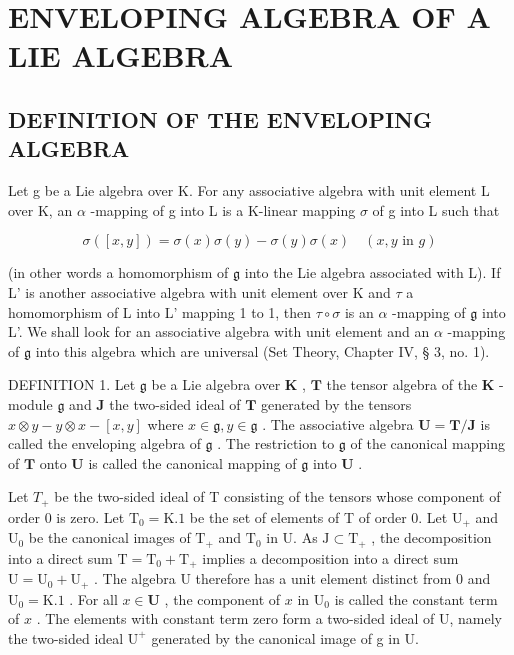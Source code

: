 \section{ENVELOPING ALGEBRA OF A LIE ALGEBRA}

\subsection{DEFINITION OF THE ENVELOPING ALGEBRA}

Let g be a Lie algebra over K. For any associative algebra with unit element L over K, an \(\alpha\) -mapping of g into L is a K-linear mapping \(\sigma\) of g into L such that

\[
\sigma ([ x, y ]) = \sigma (x) \sigma (y) - \sigma (y) \sigma (x) \quad (x, y \text {   in   } g)
\]

(in other words a homomorphism of \(\mathfrak{g}\) into the Lie algebra associated with L). If L' is another associative algebra with unit element over K and \(\tau\) a homomorphism of L into L' mapping 1 to 1, then \(\tau \circ \sigma\) is an \(\alpha\) -mapping of \(\mathfrak{g}\) into L'. We shall look for an associative algebra with unit element and an \(\alpha\) -mapping of \(\mathfrak{g}\) into this algebra which are universal (Set Theory, Chapter IV, § 3, no. 1).

DEFINITION 1. Let \(\mathfrak{g}\) be a Lie algebra over \(\mathbf{K}\) , \(\mathbf{T}\) the tensor algebra of the \(\mathbf{K}\) -module \(\mathfrak{g}\) and \(\mathbf{J}\) the two-sided ideal of \(\mathbf{T}\) generated by the tensors \(x \otimes y - y \otimes x - [x, y]\) where \(x \in \mathfrak{g}, y \in \mathfrak{g}\) . The associative algebra \(\mathbf{U} = \mathbf{T} / \mathbf{J}\) is called the enveloping algebra of \(\mathfrak{g}\) . The restriction to \(\mathfrak{g}\) of the canonical mapping of \(\mathbf{T}\) onto \(\mathbf{U}\) is called the canonical mapping of \(\mathfrak{g}\) into \(\mathbf{U}\) .

Let \(T_{+}\) be the two-sided ideal of T consisting of the tensors whose component of order 0 is zero. Let \(\mathrm{T}_0 = \mathrm{K}.1\) be the set of elements of T of order 0. Let \(\mathrm{U}_{+}\) and \(\mathrm{U}_0\) be the canonical images of \(\mathrm{T}_{+}\) and \(\mathrm{T}_0\) in U. As \(\mathrm{J} \subset \mathrm{T}_{+}\) , the decomposition into a direct sum \(\mathrm{T} = \mathrm{T}_0 + \mathrm{T}_{+}\) implies a decomposition into a direct sum \(\mathrm{U} = \mathrm{U}_0 + \mathrm{U}_{+}\) . The algebra U therefore has a unit element distinct from 0 and \(\mathrm{U}_0 = \mathrm{K}.1\) . For all \(x \in \mathbf{U}\) , the component of \(x\) in \(\mathrm{U}_0\) is called the constant term of \(x\) . The elements with constant term zero form a two-sided ideal of U, namely the two-sided ideal \(\mathrm{U}^{+}\) generated by the canonical image of g in U.

